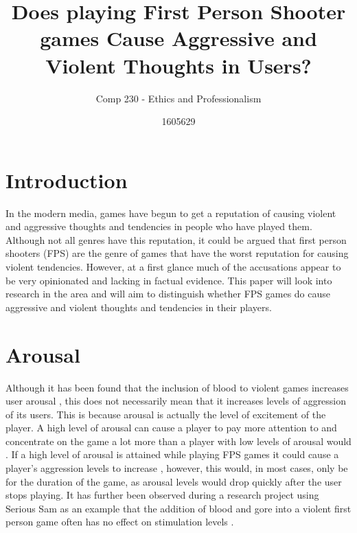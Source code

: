 \documentclass{scrartcl}
\title{Does playing First Person Shooter games Cause Aggressive and Violent Thoughts in Users? }
\subtitle{Comp 230 - Ethics and Professionalism}
\author{1605629}
\begin{document}
\maketitle


\section{Introduction}
In the modern media, games have begun to get a reputation of causing violent and aggressive thoughts and tendencies in people who have played them. Although not all genres have this reputation, it could be argued that first person shooters (FPS) are the genre of games that have the worst reputation for causing violent tendencies. However, at a first glance much of the accusations appear to be very opinionated and lacking in factual evidence. This paper will look into research in the area and  will aim to distinguish whether FPS games do cause aggressive and violent thoughts and tendencies in their players.

\section{Arousal}
Although it has been found that the inclusion of blood to violent games increases user arousal \cite {ballard1996mortal}, this does not necessarily mean that it increases levels of aggression of its users. This is because arousal is actually the level of excitement of the player. A high level of arousal can cause a player to pay more attention to and concentrate on the game a lot more than a player with low levels of arousal would \cite {jeong2015brand}. If a high level of arousal is attained while playing FPS games it could cause a player's aggression levels to increase \cite{jeong2015brand}, however, this would, in most cases, only be for the duration of the game, as arousal levels would drop quickly after the user stops playing. It has further been observed during a research project using Serious Sam as an example that the addition of blood and gore into a violent first person game often has no effect on stimulation levels \cite{ashbarry2016blood}. 
\end{document}
